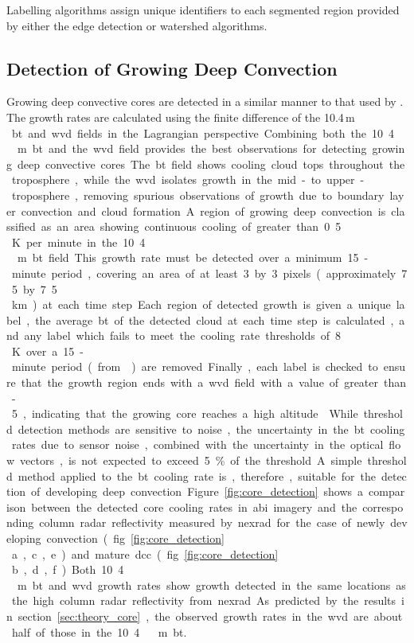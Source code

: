 Labelling algorithms assign unique identifiers to each segmented region provided by either the edge detection or watershed algorithms.


\subsection{Detection of Growing Deep Convection} \label{sec:core_detection}

Growing deep convective cores are detected in a similar manner to that used by \citet{zinner_cb-tram_2008}.
The growth rates are calculated using the finite difference of the 10.4\,\unit{\mu m } \acrshort{bt} and \acrshort{wvd} fields in the Lagrangian perspective.
Combining both the 10.4\,\unit{\mu m} \acrshort{bt} and the \acrshort{wvd} field provides the best observations for detecting growing deep convective cores.
The \acrshort{bt} field shows cooling cloud tops throughout the troposphere, while the \acrshort{wvd} isolates growth in the mid- to upper-troposphere, removing spurious observations of growth due to boundary layer convection and cloud formation.

A region of growing deep convection is classified as an area showing continuous cooling of greater than 0.5\,\unit{K} per minute in the 10.4\,\unit{\mu m} \acrshort{bt} field.
This growth rate must be detected over a minimum 15-minute period, covering an area of at least 3 by 3 pixels (approximately 7.5 by 7.5\,\unit{km}) at each time step.
Each region of detected growth is given a unique label, the average \acrshort{bt} of the detected cloud at each time step is calculated, and any label which fails to meet the cooling rate thresholds of 8\,\unit{K} over a 15-minute period (from \citep{roberts_nowcasting_2003, hartung_intercomparison_2013}) are removed.
Finally, each label is checked to ensure that the growth region ends with a \acrshort{wvd} field with a value of greater than -5, indicating that the growing core reaches a high altitude \citep{muller_role_2018}.
While threshold detection methods are sensitive to noise, the uncertainty in the \acrshort{bt} cooling rates due to sensor noise, combined with the uncertainty in the optical flow vectors, is not expected to exceed 5\% of the threshold.
A simple threshold method applied to the \acrshort{bt} cooling rate is, therefore, suitable for the detection of developing deep convection.

Figure~\ref{fig:core_detection} shows a comparison between the detected core cooling rates in \acrshort{abi} imagery and the corresponding column radar reflectivity measured by \acrshort{nexrad} for the case of newly developing convection (fig.~\ref{fig:core_detection}\,a,c,e) and mature \acrshort{dcc} (fig.~\ref{fig:core_detection}\,b,d,f)
Both 10.4\,\unit{\mu m} \acrshort{bt} and \acrshort{wvd} growth rates show growth detected in the same locations as the high column radar reflectivity from \acrshort{nexrad}.
As predicted by the results in section~\ref{sec:theory_core}, the observed growth rates in the \acrshort{wvd} are about half of those in the 10.4\,\unit{\mu m} \acrshort{bt}.


